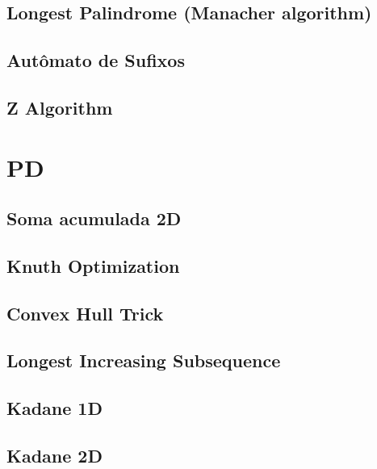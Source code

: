 \subsection{Longest Palindrome (Manacher algorithm)}
\raggedbottom
\hrulefill
\subsection{Autômato de Sufixos}
\raggedbottom
\hrulefill
\subsection{Z Algorithm}
\raggedbottom
\hrulefill

\section{PD}
\subsection{Soma acumulada 2D}
\raggedbottom
\hrulefill
\subsection{Knuth Optimization}
\raggedbottom
\hrulefill
\subsection{Convex Hull Trick}
\raggedbottom
\hrulefill
\subsection{Longest Increasing Subsequence}
\raggedbottom
\hrulefill
\subsection{Kadane 1D}
\raggedbottom
\hrulefill
\subsection{Kadane 2D}
\raggedbottom
\hrulefill
